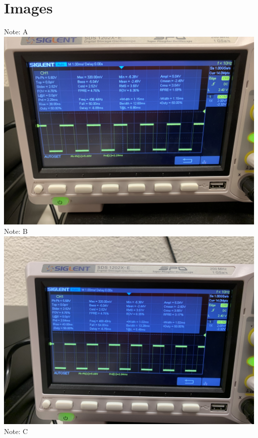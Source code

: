 \documentclass[]{article}
\begin{document}
\section*{Images}
	\begin{center}
		\pagebreak
		Note: A\\
		\includegraphics[scale=.05]{./images/0.jpg}\\
		Note: B\\
		\includegraphics[scale=.05]{./images/1.jpg}\\
		Note: C\\

\end{center}
\end{document}
